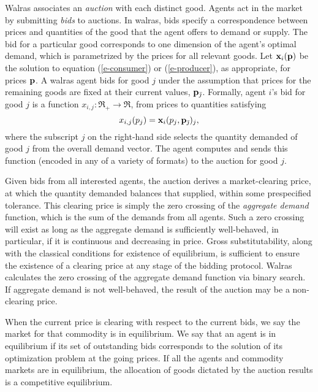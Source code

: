 {\sc Walras} associates an {\em auction\/} with each distinct good.
Agents act in the market by submitting {\em bids\/} to auctions.
In {\sc walras}, bids specify a correspondence between prices and quantities
of the good that the agent offers to demand or supply.
The bid for a particular good corresponds to one dimension of the agent's 
optimal demand, which is parametrized by
the prices for all relevant goods.
Let ${\bf x}_{i}({\bf p})$ be the solution to equation 
(\ref{e-consumer}) or (\ref{e-producer}), as appropriate, for prices 
$\bf p$.
A {\sc walras} agent bids for good $j$ under
the assumption that prices for the remaining goods are fixed at their 
current values, ${\bf p}_{\bar{\jmath}}$.
Formally, agent $i$'s bid for good $j$ is a function 
$x_{i,j}:\Re_+\rightarrow\Re$, from prices to quantities satisfying
\begin{displaymath}
	x_{i,j}(p_j) = {\bf x}_{i}(p_j,{\bf p}_{\bar{\jmath}})_j,
\end{displaymath}
where the subscript $j$ on the right-hand side selects the quantity 
demanded of good $j$ from the overall demand vector.
The agent computes and sends this function (encoded in any of a
variety of formats) to the auction for good $j$.

Given bids from all interested agents, the auction derives a market-clearing
price, at which the quantity demanded
balances that supplied, within some prespecified tolerance.
This clearing price is simply the zero crossing of the {\em aggregate demand\/}
function, which is the sum of the demands from all agents.
Such a zero crossing will exist as long as the aggregate demand is 
sufficiently well-behaved, in particular, if it is continuous and 
decreasing in price.  Gross substitutability, along with the classical 
conditions for existence of equilibrium, is sufficient to ensure the 
existence of a clearing price at any stage of the bidding protocol.
{\sc Walras} calculates the zero crossing of the aggregate demand function
via binary search.  If aggregate demand is not well-behaved, the result 
of the auction may be a non-clearing price.

When the current price is clearing with respect to the current bids,
we say the market for that commodity is in equilibrium.
We say that an agent is in equilibrium if its set of
outstanding bids corresponds to the solution of its
optimization problem at the going prices. If all the agents and commodity 
markets are in equilibrium, the allocation of goods dictated by the 
auction results is a competitive equilibrium.

